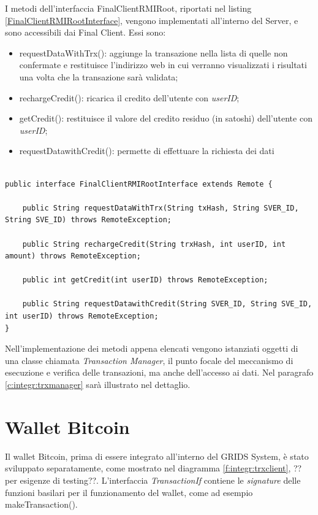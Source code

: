 I metodi dell'interfaccia FinalClientRMIRoot, riportati nel listing \ref{FinalClientRMIRootInterface}, vengono implementati all'interno del Server, e sono accessibili dai Final Client. Essi sono:

\begin{itemize}
    \item requestDataWithTrx(): aggiunge la transazione nella lista di quelle non confermate e restituisce l'indirizzo web in cui verranno visualizzati i risultati una volta che la transazione sarà validata;
    \item rechargeCredit(): ricarica il credito dell'utente con \textit{userID};
    \item getCredit(): restituisce il valore del credito residuo (in satoshi) dell'utente con \textit{userID};
    \item requestDatawithCredit(): permette di effettuare la richiesta dei dati 
\end{itemize}

\begin{lstlisting}[caption={FinalClientRMIRootInterface.java},label={FinalClientRMIRootInterface},style={c}]

public interface FinalClientRMIRootInterface extends Remote {
    
    public String requestDataWithTrx(String txHash, String SVER_ID, String SVE_ID) throws RemoteException;
    
    public String rechargeCredit(String trxHash, int userID, int amount) throws RemoteException;
    
    public int getCredit(int userID) throws RemoteException;
    
    public String requestDatawithCredit(String SVER_ID, String SVE_ID, int userID) throws RemoteException;
}

\end{lstlisting}

Nell'implementazione dei metodi appena elencati vengono istanziati oggetti di una classe chiamata \textit{Transaction Manager}, il punto focale del meccanismo di esecuzione e verifica delle transazioni, ma anche dell'accesso ai dati. Nel paragrafo \ref{c:integr:trxmanager} sarà illustrato nel dettaglio.

\section{Wallet Bitcoin}
\label{c:integr:wallet}

Il wallet Bitcoin, prima di essere integrato all'interno del GRIDS System, è stato sviluppato separatamente, come mostrato nel diagramma \ref{f:integr:trxclient}, ??per esigenze di testing??. L'interfaccia \textit{TransactionIf} contiene le \textit{signature} delle funzioni basilari per il funzionamento del wallet, come ad esempio makeTransaction(). 

